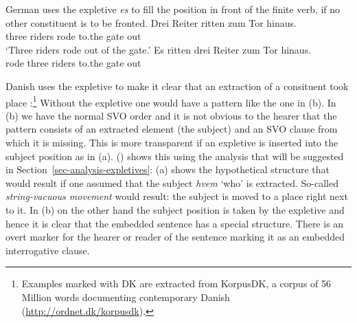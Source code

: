 German uses the expletive \emph{es} to fill the position in front of the finite verb, if no other
constituent is to be fronted.
\eal
\ex 
\gll Drei Reiter ritten zum Tor hinaus.\\
     three riders rode  to.the gate out\\\german
\glt `Three riders rode out of the gate.'
\ex 
\gll Es ritten drei Reiter zum Tor hinaus.\\
     \expl{} rode   three riders to.the gate out\\
\zl

Danish uses the expletive to make it clear that an extraction of a consituent took place
\citep[]{MOe2011a}:\footnote{
  Examples marked with DK are extracted from KorpusDK, a corpus of 56 Million words documenting
  contemporary Danish (\url{http://ordnet.dk/korpusdk}).
}
\eal
\label{ex-danish-interrogative-expletive}
\zl
Without the expletive one would have a pattern like the one in (b). In (b) we have the
normal SVO order and it is not obvious to the hearer that the pattern consists of an extracted
element (the subject) and an SVO clause from which it is missing. This is more transparent if an
expletive is inserted into the subject position as in (a). () shows this using the
analysis that will be suggested in Section~\ref{sec-analysis-expletives}: (a) shows the hypothetical
structure that would result if one assumed that the subject \emph{hvem} `who' is
extracted. So-called \emph{string-vacuous movement} would result: the subject is moved to a place
right next to it. In (b) on the other hand the subject position is taken by the expletive and
hence it is clear that the embedded sentence has a special structure. There is an overt marker for
the hearer or reader of the sentence marking it as an embedded interrogative clause.
\eal
{}
\zl

